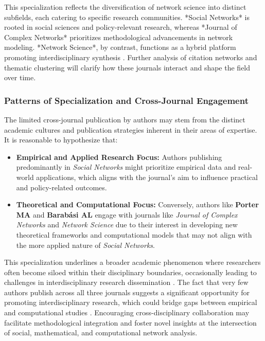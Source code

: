 \documentclass[twocolumn]{article}
\begin{document}
This specialization reflects the diversification of network science into distinct subfields, each catering to specific research communities. *Social Networks* is rooted in social sciences and policy-relevant research, whereas *Journal of Complex Networks* prioritizes methodological advancements in network modeling. *Network Science*, by contrast, functions as a hybrid platform promoting interdisciplinary synthesis \cite{Lazer2009,Borner2020}. Further analysis of citation networks and thematic clustering will clarify how these journals interact and shape the field over time.

	
	\subsubsection*{Patterns of Specialization and Cross-Journal Engagement}
	
	The limited cross-journal publication by authors may stem from the distinct academic cultures and publication strategies inherent in their areas of expertise. It is reasonable to hypothesize that:
	\begin{itemize}
		\item \textbf{Empirical and Applied Research Focus:} Authors publishing predominantly in \textit{Social Networks} might prioritize empirical data and real-world applications, which aligns with the journal's aim to influence practical and policy-related outcomes.
		\item \textbf{Theoretical and Computational Focus:} Conversely, authors like \textbf{Porter MA} and \textbf{Barabási AL} engage with journals like \textit{Journal of Complex Networks} and \textit{Network Science} due to their interest in developing new theoretical frameworks and computational models that may not align with the more applied nature of \textit{Social Networks}.
	\end{itemize}
	
	This specialization underlines a broader academic phenomenon where researchers often become siloed within their disciplinary boundaries, occasionally leading to challenges in interdisciplinary research dissemination \cite{Leahey2016,Porter2009}. The fact that very few authors publish across all three journals suggests a significant opportunity for promoting interdisciplinary research, which could bridge gaps between empirical and computational studies \cite{Wagner2011,Chavarro2017}. Encouraging cross-disciplinary collaboration may facilitate methodological integration and foster novel insights at the intersection of social, mathematical, and computational network analysis.
	
\end{document}

